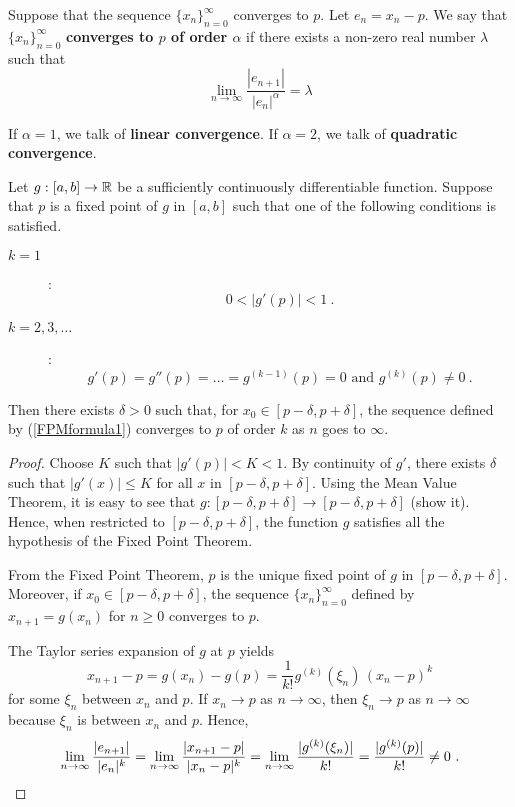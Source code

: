 \begin{defn}
Suppose that the sequence $\{x_n\}_{n=0}^\infty$ converges to $p$.
Let $e_n = x_n - p$.  We say that $\{x_n\}_{n=0}^\infty$
{\bfseries converges to $p$ of order $\alpha$} if there exists a non-zero real number $\lambda$
such that
\[
\lim_{n\rightarrow \infty}
\frac{|e_{n+1}|}{|e_n|^\alpha} = \lambda
\]
\end{defn}

If $\alpha = 1$, we talk of {\bfseries linear
convergence}.  If $\alpha = 2$,
we talk of {\bfseries quadratic convergence}.

\begin{theorem}
Let $g:[a,b] \rightarrow \mathbb{R}$ be a sufficiently continuously
differentiable function.  Suppose that $p$ is a fixed point of $g$ in
$[a,b]$ such that one of the following conditions is satisfied. 
\begin{description}
\item[$k=1$]:
\[
0 < |g'(p)| < 1 \ .
\]
\item[$k=2,3,\ldots$]:
\[
g'(p) = g''(p) = \ldots = g^{(k-1)}(p) = 0 \text{ and } g^{(k)}(p) \not=0 \ .
\]
\end{description}
Then there exists $\delta > 0$ such that, for
$x_0 \in [p-\delta, p + \delta]$, the sequence defined by
(\ref{FPMformula1}) converges to $p$ of order $k$ as $n$ goes to
$\infty$.
\label{FPorder}
\end{theorem}

\begin{proof}
Choose $K$ such that $|g'(p)| < K <1$.  By continuity of $g'$,
there exists $\delta$ such that $|g'(x)| \leq K$ for all $x$ in
$[p-\delta, p+\delta]$.  Using the Mean Value Theorem, it is easy to
see that $g:[p-\delta, p+\delta] \rightarrow [p-\delta, p+\delta]$
(show it).  Hence, when restricted to $[p-\delta, p + \delta]$, the
function $g$ satisfies all the hypothesis of the Fixed Point Theorem.

From the Fixed Point Theorem, $p$ is the unique fixed point of $g$ in
$[p-\delta, p + \delta]$.  Moreover, if
$x_0 \in [p-\delta, p + \delta]$, the sequence $\{x_n\}_{n=0}^\infty$
defined by $x_{n+1} = g(x_n)$ for $n \geq 0$ converges to $p$.

The Taylor series expansion of $g$ at $p$ yields
\[
x_{n+1} - p = g(x_n) - g(p) = \frac{1}{k!} g^{(k)}(\xi_n)\,(x_n - p)^k
\]
for some $\xi_n$ between $x_n$ and $p$.  If $x_n \rightarrow p$ as
$n \rightarrow \infty$, then $\xi_n \rightarrow p$ as
$n \rightarrow \infty$ because $\xi_n$ is between $x_n$ and $p$.
Hence,
\[
\lim_{n\rightarrow \infty}\frac{|e_{n+1}|}{|e_n|^k}
= \lim_{n\rightarrow \infty}\frac{|x_{n+1}-p|}{|x_n-p|^k} \\
= \lim_{n\rightarrow \infty}\frac{|g^{(k)}(\xi_n)|}{k!}
= \frac{|g^{(k)}(p)|}{k!} \neq 0 \ .  \qedhere
\]
\end{proof}

